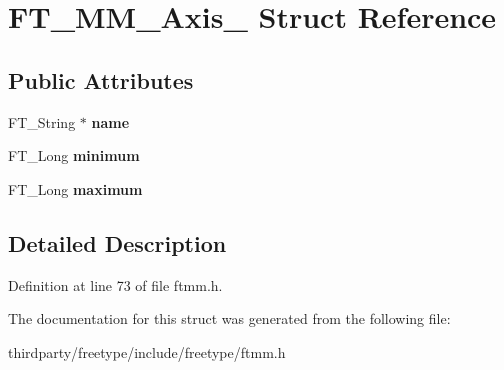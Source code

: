 \hypertarget{struct_f_t___m_m___axis__}{}\section{F\+T\+\_\+\+M\+M\+\_\+\+Axis\+\_\+ Struct Reference}
\label{struct_f_t___m_m___axis__}
\subsection*{Public Attributes}
\begin{DoxyCompactItemize}
\item 
\mbox{\label{struct_f_t___m_m___axis___a5c784efa44906c0e2b715eb1f866a09f}} 
F\+T\+\_\+\+String $\ast$ {\bfseries name}
\item 
\mbox{\label{struct_f_t___m_m___axis___a9dc31f02b350b1356e0896673b5b73a4}} 
F\+T\+\_\+\+Long {\bfseries minimum}
\item 
\mbox{\label{struct_f_t___m_m___axis___addac1f8e71da1bedea9b393ae2751881}} 
F\+T\+\_\+\+Long {\bfseries maximum}
\end{DoxyCompactItemize}


\subsection{Detailed Description}


Definition at line 73 of file ftmm.\+h.



The documentation for this struct was generated from the following file\+:\begin{DoxyCompactItemize}
\item 
thirdparty/freetype/include/freetype/ftmm.\+h\end{DoxyCompactItemize}
